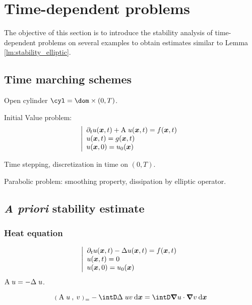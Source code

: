 
\chapter{Time-dependent problems}\label{chap:td}

The objective of this section is to introduce the \apriori stability analysis of time-dependent problems on several examples to obtain estimates similar to Lemma \ref{lm:stability_elliptic}.

\section{Time marching schemes}

Open cylinder $\cyl = \dom \times (0,T)$.

Initial Value problem:
\begin{equation*}
\left\lvert
\begin{array}{l}
\partial_t u({{\boldsymbol x}},t) + {\mathrm A}\;u({{\boldsymbol x}},t) = f({{\boldsymbol x}},t) \\
u({{\boldsymbol x}},t) = g({{\boldsymbol x}},t) \\
u({{\boldsymbol x}},0) = u_0({{\boldsymbol x}})
\end{array}
\right.
\end{equation*}

Time stepping, discretization in time on $(0,T)$.

Parabolic problem: smoothing property, dissipation by elliptic operator.

\section{\textit{A priori} stability estimate}

\subsection{Heat equation}

\begin{equation*}
\left\lvert
\begin{array}{l}
\partial_t u({{\boldsymbol x}},t) - \Delta u({{\boldsymbol x}},t) = f({{\boldsymbol x}},t) \\
u({{\boldsymbol x}},t) = 0 \\
u({{\boldsymbol x}},0) = u_0({{\boldsymbol x}})
\end{array}
\right.
\end{equation*}
${\mathrm A}\;u = - \Delta\;u$.

\begin{equation*}
\InnerP{\matA\;u}{v} = - \intD \Delta\;u v \dxx = \intD \Grad u \cdot \Grad v \dxx
\end{equation*}

